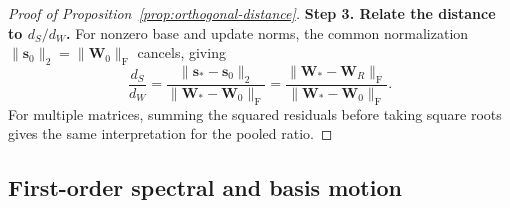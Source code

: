 \begin{proof}[Proof of Proposition~\ref{prop:orthogonal-distance}]
\textbf{Step 3. Relate the distance to $d_S/d_W$.} For nonzero base and update norms, the common normalization $\|\bm s_0\|_2=\|\bm W_0\|_{\mathrm F}$ cancels, giving
\begin{equation*}
\frac{d_S}{d_W}
=\frac{\|\bm s_*-\bm s_0\|_2}{\|\bm W_*-\bm W_0\|_{\mathrm F}}
=\frac{\|\bm W_*-\bm W_R\|_{\mathrm F}}{\|\bm W_*-\bm W_0\|_{\mathrm F}}.
\end{equation*}
For multiple matrices, summing the squared residuals before taking square roots gives the same interpretation for the pooled ratio.
\end{proof}

\subsection{First-order spectral and basis motion}
